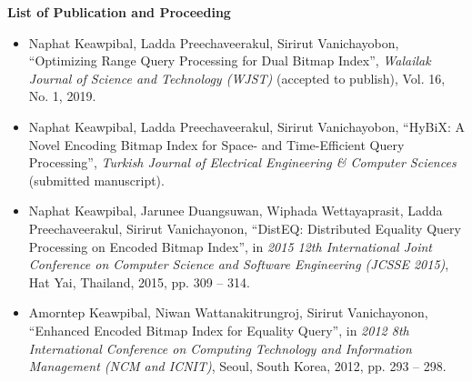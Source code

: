 \documentclass[../main/thesis.tex]{subfiles}
\begin{document}
\begin{vitae}
	
	\setlength\parindent{0cm}
	\textbf{List of Publication and Proceeding}
	\begin{itemize}
		\justifying
		\item Naphat Keawpibal, Ladda Preechaveerakul, Sirirut Vanichayobon, ``Optimizing Range Query Processing for Dual Bitmap Index'', \textit{Walailak Journal of Science and Technology (WJST)} (accepted to publish), Vol. 16, No. 1, 2019.
		
		\item Naphat Keawpibal, Ladda Preechaveerakul, Sirirut Vanichayobon, ``HyBiX: A Novel Encoding Bitmap Index for Space- and Time-Efficient Query Processing'', \textit{Turkish Journal of Electrical Engineering \& Computer Sciences} (submitted manuscript).
		
		\item Naphat Keawpibal, Jarunee Duangsuwan, Wiphada Wettayaprasit, Ladda Preechaveerakul, Sirirut Vanichayonon, ``DistEQ: Distributed Equality Query Processing on Encoded Bitmap Index'', in \textit{2015 12th International Joint Conference on Computer Science and Software Engineering (JCSSE 2015)},
		Hat Yai, Thailand, 2015, pp. 309 -- 314.
		
		\item Amorntep Keawpibal, Niwan Wattanakitrungroj, Sirirut Vanichayonon,
		``Enhanced Encoded Bitmap Index for Equality Query'', in \textit{2012 8th International Conference on Computing Technology and Information Management (NCM and ICNIT)}, Seoul, South Korea, 2012, pp. 293 -- 298.
	\end{itemize}
\end{vitae}
\end{document}
